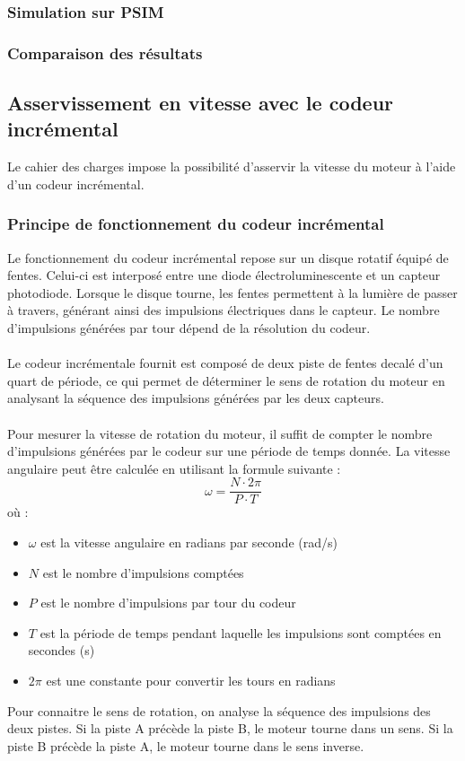 \subsubsection{Simulation sur PSIM}

\subsubsection{Comparaison des résultats}

\subsection{Asservissement en vitesse avec le codeur incrémental}
Le cahier des charges impose la possibilité d'asservir la vitesse du moteur à l'aide d'un codeur incrémental.
\subsubsection{Principe de fonctionnement du codeur incrémental}

Le fonctionnement du codeur incrémental repose sur un disque rotatif équipé de fentes. Celui-ci est interposé entre une diode électroluminescente et un capteur photodiode. Lorsque le disque tourne, les fentes permettent à la lumière de passer à travers, générant ainsi des impulsions électriques dans le capteur. Le nombre d'impulsions générées par tour dépend de la résolution du codeur.
\\\\
Le codeur incrémentale fournit est composé de deux piste de fentes decalé d'un quart de période, ce qui permet de déterminer le sens de rotation du moteur en analysant la séquence des impulsions générées par les deux capteurs. 
\\\\
Pour mesurer la vitesse de rotation du moteur, il suffit de compter le nombre d'impulsions générées par le codeur sur une période de temps donnée. La vitesse angulaire peut être calculée en utilisant la formule suivante :
\begin{equation}
    \omega = \frac{N \cdot 2\pi}{P \cdot T}
\end{equation}
où :
\begin{itemize}
    \item $\omega$ est la vitesse angulaire en radians par seconde (rad/s)
    \item $N$ est le nombre d'impulsions comptées
    \item $P$ est le nombre d'impulsions par tour du codeur
    \item $T$ est la période de temps pendant laquelle les impulsions sont comptées en secondes (s)
    \item $2\pi$ est une constante pour convertir les tours en radians
\end{itemize}

Pour connaitre le sens de rotation, on analyse la séquence des impulsions des deux pistes. Si la piste A précède la piste B, le moteur tourne dans un sens. Si la piste B précède la piste A, le moteur tourne dans le sens inverse.
